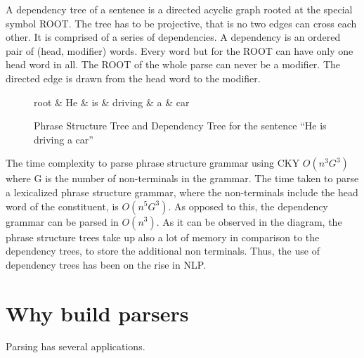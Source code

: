 \documentclass{book}
\begin{document}
A dependency tree of a sentence is a directed acyclic graph rooted at the special symbol ROOT. The tree has to be projective, that is no two edges can cross each other. It is comprised of a series of dependencies. A dependency is an ordered pair of (head, modifier) words. Every word but for the ROOT can have only one head word in all. The ROOT of the whole parse can never be a modifier. The directed edge is drawn from the head word to the modifier.

\begin{figure}
\centering
{}

\begin{dependency}[theme = simple]
\begin{deptext}
root \& He \& is \& driving \& a \& car \\
\end{deptext}
\end{dependency}
\caption{Phrase Structure Tree and Dependency Tree for the sentence ``He is driving a car''}
\end{figure}

The time complexity to parse phrase structure grammar using CKY $O(n^3G^3)$ where G is the number of non-terminals in the grammar. The time taken to parse a lexicalized phrase structure grammar, where the non-terminals include the head word of the constituent, is $O(n^5G^3)$. As opposed to this, the dependency grammar can be parsed in $O(n^3)$. As it can be observed in the diagram, the phrase structure trees take up also a lot of memory in comparison to the dependency trees, to store the additional non terminals. Thus, the use of dependency trees has been on the rise in NLP. 

\section{Why build parsers}

Parsing has several applications. 
\end{document}
